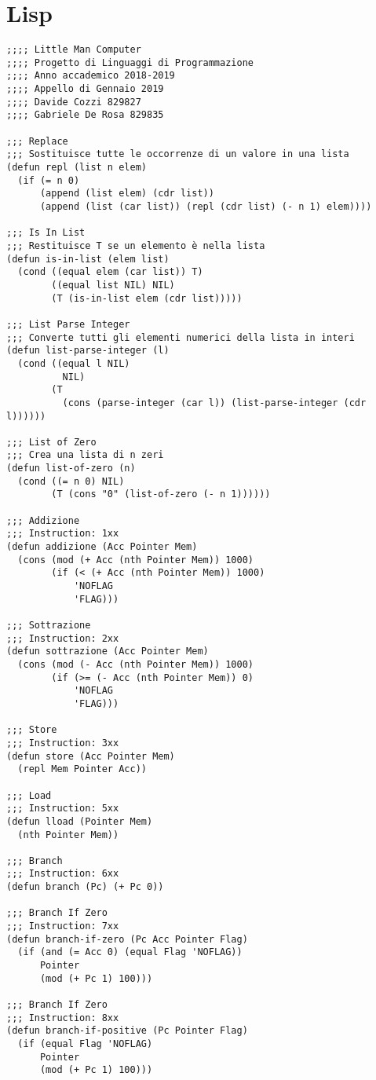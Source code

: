 \documentclass[a4paper,12pt, oneside]{book}
\begin{document}
\section{Lisp}
\begin{verbatim}
;;;; Little Man Computer
;;;; Progetto di Linguaggi di Programmazione
;;;; Anno accademico 2018-2019
;;;; Appello di Gennaio 2019
;;;; Davide Cozzi 829827
;;;; Gabriele De Rosa 829835

;;; Replace
;;; Sostituisce tutte le occorrenze di un valore in una lista
(defun repl (list n elem)
  (if (= n 0)
      (append (list elem) (cdr list))
      (append (list (car list)) (repl (cdr list) (- n 1) elem))))

;;; Is In List
;;; Restituisce T se un elemento è nella lista
(defun is-in-list (elem list)
  (cond ((equal elem (car list)) T)
        ((equal list NIL) NIL)
        (T (is-in-list elem (cdr list)))))

;;; List Parse Integer
;;; Converte tutti gli elementi numerici della lista in interi
(defun list-parse-integer (l)
  (cond ((equal l NIL) 
          NIL)
        (T 
          (cons (parse-integer (car l)) (list-parse-integer (cdr l))))))

;;; List of Zero
;;; Crea una lista di n zeri
(defun list-of-zero (n)
  (cond ((= n 0) NIL)
        (T (cons "0" (list-of-zero (- n 1))))))

;;; Addizione
;;; Instruction: 1xx 
(defun addizione (Acc Pointer Mem)
  (cons (mod (+ Acc (nth Pointer Mem)) 1000)
        (if (< (+ Acc (nth Pointer Mem)) 1000)
            'NOFLAG
            'FLAG)))

;;; Sottrazione
;;; Instruction: 2xx 
(defun sottrazione (Acc Pointer Mem)
  (cons (mod (- Acc (nth Pointer Mem)) 1000)
        (if (>= (- Acc (nth Pointer Mem)) 0)
            'NOFLAG
            'FLAG)))

;;; Store
;;; Instruction: 3xx 
(defun store (Acc Pointer Mem)
  (repl Mem Pointer Acc))

;;; Load
;;; Instruction: 5xx 
(defun lload (Pointer Mem)
  (nth Pointer Mem))

;;; Branch
;;; Instruction: 6xx 
(defun branch (Pc) (+ Pc 0))

;;; Branch If Zero
;;; Instruction: 7xx 
(defun branch-if-zero (Pc Acc Pointer Flag)
  (if (and (= Acc 0) (equal Flag 'NOFLAG))
      Pointer
      (mod (+ Pc 1) 100)))

;;; Branch If Zero
;;; Instruction: 8xx 
(defun branch-if-positive (Pc Pointer Flag)
  (if (equal Flag 'NOFLAG)
      Pointer
      (mod (+ Pc 1) 100)))


\end{verbatim}
\end{document}
